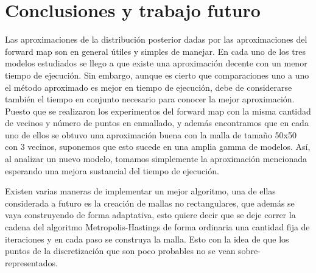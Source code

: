 \chapter{Conclusiones y trabajo futuro}

Las aproximaciones de la distribución posterior dadas por las aproximaciones del forward map son en general útiles y simples de manejar. En cada uno de los tres modelos estudiados se llego a que existe una aproximación decente con un menor tiempo de ejecución. Sin embargo, aunque es cierto que comparaciones uno a uno el método aproximado es mejor en tiempo de ejecución, debe de considerarse también el tiempo en conjunto necesario para conocer la mejor aproximación. Puesto que se realizaron los experimentos del forward map con la misma cantidad de vecinos y número de puntos en enmallado, y además encontramos que en cada uno de ellos se obtuvo una aproximación buena con la malla de tamaño 50x50 con 3 vecinos, suponemos que esto sucede en una amplia gamma de modelos. Así, al analizar un nuevo modelo, tomamos simplemente la aproximación mencionada esperando una mejora sustancial del tiempo de ejecución.

Existen varias maneras de implementar un mejor algoritmo, una de ellas considerada a futuro es la creación de mallas no rectangulares, que además se vaya construyendo de forma adaptativa, esto quiere decir que se deje correr la cadena del algoritmo Metropolis-Hastings de forma ordinaria una cantidad fija de iteraciones y en cada paso se construya la malla. Esto con la idea de que los puntos de la discretización que son poco probables no se vean sobre-representados.